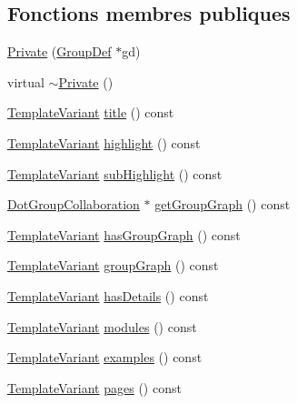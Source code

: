 \subsection*{Fonctions membres publiques}
\begin{DoxyCompactItemize}
\item 
\hyperlink{class_module_context_1_1_private_a8346194553f06510821e54641ca6ec43}{Private} (\hyperlink{class_group_def}{Group\+Def} $\ast$gd)
\item 
virtual \hyperlink{class_module_context_1_1_private_aff97243dbe4c729d6f17417b24305f0c}{$\sim$\+Private} ()
\item 
\hyperlink{class_template_variant}{Template\+Variant} \hyperlink{class_module_context_1_1_private_a9a61bbe49df34c9d6f6a18426485e192}{title} () const 
\item 
\hyperlink{class_template_variant}{Template\+Variant} \hyperlink{class_module_context_1_1_private_a4c758421b62b6539f9818bd0cb9de1a3}{highlight} () const 
\item 
\hyperlink{class_template_variant}{Template\+Variant} \hyperlink{class_module_context_1_1_private_a5eb2733b8d0b61e689aa0355c720d96e}{sub\+Highlight} () const 
\item 
\hyperlink{class_dot_group_collaboration}{Dot\+Group\+Collaboration} $\ast$ \hyperlink{class_module_context_1_1_private_a808225ecca29bceb115c8841d843293a}{get\+Group\+Graph} () const 
\item 
\hyperlink{class_template_variant}{Template\+Variant} \hyperlink{class_module_context_1_1_private_a82b643000faeb9f3111a96bf636f1687}{has\+Group\+Graph} () const 
\item 
\hyperlink{class_template_variant}{Template\+Variant} \hyperlink{class_module_context_1_1_private_a44a564f456af5f47a35eee7dc504bf51}{group\+Graph} () const 
\item 
\hyperlink{class_template_variant}{Template\+Variant} \hyperlink{class_module_context_1_1_private_aefe29e97e03a76b91b8fdf25925c2f71}{has\+Details} () const 
\item 
\hyperlink{class_template_variant}{Template\+Variant} \hyperlink{class_module_context_1_1_private_ae23c8667463b2ca2c6fd995e1ef17820}{modules} () const 
\item 
\hyperlink{class_template_variant}{Template\+Variant} \hyperlink{class_module_context_1_1_private_a52961846f195cbd2e5a5d104043bddc9}{examples} () const 
\item 
\hyperlink{class_template_variant}{Template\+Variant} \hyperlink{class_module_context_1_1_private_a03e734fc01410490442e2387c276f31e}{pages} () const 

\end{DoxyCompactItemize}
